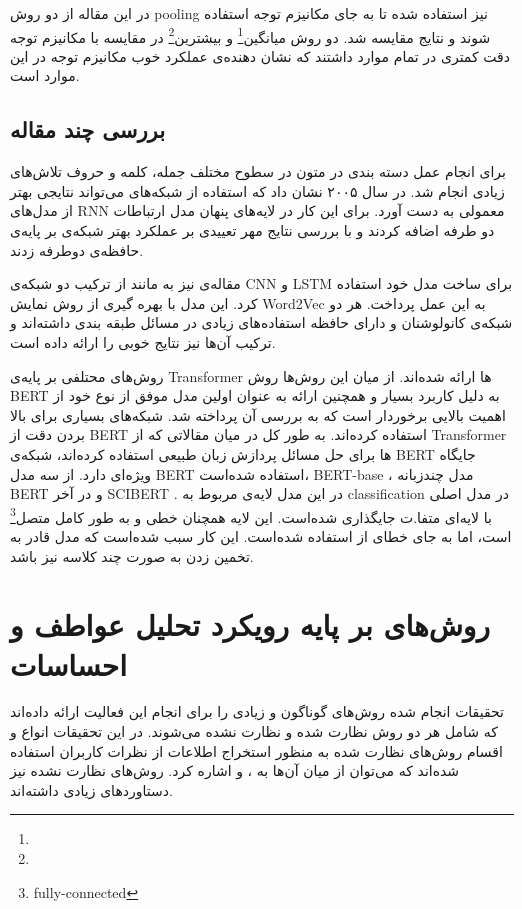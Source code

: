 \documentclass[12pt, a4paper, oneside]{report}
\begin{document}
در این مقاله از دو روش
pooling
نیز استفاده شده تا به جای مکانیزم توجه استفاده شوند و نتایج مقایسه شد. 
دو روش
میانگین\footnote{}
و
بیشترین\footnote{}
در مقایسه با مکانیزم توجه دقت کمتری در تمام موارد داشتند که نشان دهنده‌ی عملکرد خوب مکانیزم توجه در این موارد است.

\subsection{بررسی چند مقاله}

برای انجام عمل دسته بندی در متون در سطوح مختلف جمله، کلمه و حروف تلاش‌های زیادی انجام شد.
\cite{graves2005framewise}
در سال ۲۰۰۵ نشان داد که استفاده از شبکه‌های
می‌تواند نتایجی بهتر از مدل‌های
RNN
معمولی به دست آورد. برای این کار در لایه‌های پنهان مدل ارتباطات دو طرفه اضافه کردند و با بررسی نتایج مهر تعییدی
بر عملکرد بهتر شبکه‌ی بر پایه‌ی حافظه‌ی دوطرفه زدند.

مقاله‌ی
\cite{guggilla-etal-2016-cnn}
نیز به مانند 
\cite{wang-etal-2016-combination}
از ترکیب دو شبکه‌ی
CNN
و
LSTM
برای ساخت مدل خود استفاده کرد. این مدل با بهره گیری از روش نمایش
Word2Vec
به این عمل پرداخت. هر دو شبکه‌ی کانولوشنان و دارای حافظه استفاده‌های زیادی در مسائل طبقه بندی داشته‌اند و ترکیب آن‌ها
نیز نتایج خوبی را ارائه داده است.

روش‌های محتلفی بر پایه‌ی
Transformer
ها ارائه شده‌اند. از میان این روش‌ها روش
BERT
به دلیل کاربرد بسیار و همچنین ارائه به عنوان اولین مدل موفق از نوع خود از اهمیت بالایی برخوردار است که به بررسی آن
پرداخته شد. شبکه‌های بسیاری برای بالا بردن دقت از
BERT
استفاده کرده‌اند. به طور کل در میان مقالاتی که از
Transformer
ها برای حل مسائل پردازش زبان طبیعی استفاده کرده‌اند، شبکه‌ی
BERT
جایگاه ویژه‌ای دارد.
\cite{schmidt2020data}
از سه مدل
BERT
استفاده شده‌است،
BERT-base
، مدل چندزبانه
BERT
و در آخر
SCIBERT
.
در این مدل لایه‌ی مربوط به
classification
در مدل اصلی با لایه‌ای متفا.ت جایگذاری شده‌است. این لایه همچنان خطی و
به طور کامل متصل\footnote{fully-connected}
است، اما به جای خطای
از
استفاده شده‌است. این کار سبب شده‌است که مدل قادر به تخمین زدن به صورت چند کلاسه نیز باشد.

\section{روش‌های بر پایه رویکرد تحلیل عواطف و احساسات}

تحقیقات انجام شده روش‌های گوناگون و زیادی را برای انجام این فعالیت ارائه داده‌اند که شامل هر دو روش
نظارت شده و نظارت نشده می‌شوند.
در این تحقیقات انواع و اقسام روش‌های نظارت شده به منظور استخراج اطلاعات از نظرات کاربران
استفاده شده‌اند که می‌توان از میان آن‌ها به
،
و
اشاره کرد.
روش‌های نظارت نشده نیز دستاورد‌های زیادی داشته‌اند.
\end{document}
